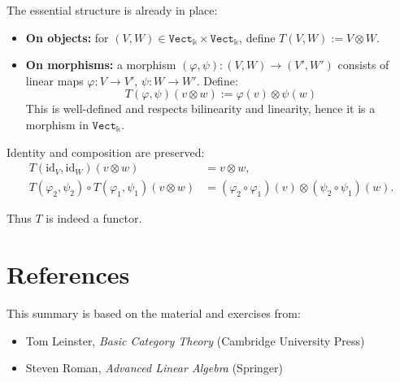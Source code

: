 \documentclass[10pt]{tufte-handout}
\begin{document}
The essential structure is already in place:

\begin{itemize}
  \item \textbf{On objects:} for $(V, W) \in \texttt{Vect}_{\mathds{k}} \times \texttt{Vect}_{\mathds{k}}$, define $T(V, W) := V \otimes W$.

  \item \textbf{On morphisms:} a morphism $(\varphi, \psi): (V, W) \to (V', W')$ consists of linear maps $\varphi: V \to V'$, $\psi: W \to W'$. Define:
  \[
  T(\varphi, \psi)(v \otimes w) := \varphi(v) \otimes \psi(w)
  \]
  This is well-defined and respects bilinearity and linearity, hence it is a morphism in $\texttt{Vect}_{\mathds{k}}$.
\end{itemize}


Identity and composition are preserved:
\begin{align*}
T(\text{id}_V, \text{id}_W)(v \otimes w) &= v \otimes w, \\
T(\varphi_2, \psi_2) \circ T(\varphi_1, \psi_1)(v \otimes w) &= (\varphi_2 \circ \varphi_1)(v) \otimes (\psi_2 \circ \psi_1)(w).
\end{align*}

Thus $T$ is indeed a functor.


\begin{center}
\end{center}

\section*{References}
This summary is based on the material and exercises from:
\begin{itemize}
    \item Tom Leinster, \textit{Basic Category Theory} (Cambridge University Press)
    \item Steven Roman, \textit{Advanced Linear Algebra} (Springer)
\end{itemize}
\end{document}
